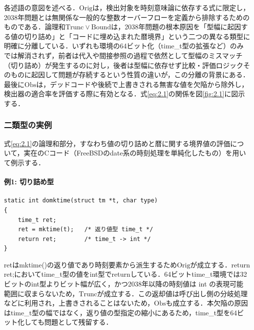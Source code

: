 \documentclass[submit,techrep,noauthor]{ipsj}
\begin{document}
各述語の意図を述べる．$\mathrm{Orig}$は，検出対象を時刻意味論に依存する式に限定し，2038年問題とは無関係な一般的な整数オーバーフローを定義から排除するためのものである．論理和$\mathrm{Trunc} \lor \mathrm{Bound}$は，2038年問題の根本原因を「型幅に起因する値の切り詰め」と「コードに埋め込まれた暦境界」という二つの異なる類型に明確に分離している．いずれも環境の64ビット化（time\_t型の拡張など）のみでは解消されず，前者は代入や間接参照の過程で依然として型幅のミスマッチ（切り詰め）が発生するのに対し，後者は型幅に依存せず比較・評価ロジックそのものに起因して問題が存続するという性質の違いが，この分離の背景にある．最後に$\mathrm{Obs}$は，デッドコードや後続で上書きされる無害な値を欠陥から除外し，検出器の適合率を評価する際に有効となる．式\ref{eq:2.1}の関係を図\ref{fig:2.1}に図示する．

\subsubsection{二類型の実例}

式\ref{eq:2.1}の論理和部分，すなわち値の切り詰めと暦に関する境界値の評価について，実在のCコード（FreeBSD\cite{ref3}のdate系の時刻処理を単純化したもの）を用いて例示する．

\paragraph*{例1: 切り詰め型}

\begin{tcolorbox}[
	enhanced,
	breakable,
	colframe=black,
	colback=black!4,
	coltext=black,
	left=2mm,
	right=2mm,
	top=2mm,
	bottom=2mm,
	enlarge top by=4pt,
	enlarge bottom by=4pt,
	before skip=4pt,
	after skip=4pt,
]
\begin{verbatim}
static int domktime(struct tm *t, char type)
{
    time_t ret;
    ret = mktime(t);   /* 返り値型 time_t */
    return ret;        /* time_t -> int */
}
\end{verbatim}
\end{tcolorbox}

retはmktime()の返り値であり時刻要素から派生するため$\mathrm{Orig}$が成立する．return ret;においてtime\_t型の値をint型でreturnしている．64ビットtime\_t環境では32ビットのint型よりビット幅が広く，かつ2038年以降の時刻値は int の表現可能範囲に収まらないため，$\mathrm{Trunc}$が成立する．この返却値は呼び出し側の分岐処理などに利用され，上書きされることはないため，$\mathrm{Obs}$も成立する．本欠陥の原因はtime\_t型の幅ではなく，返り値の型指定の縮小にあるため，time\_t型を64ビット化しても問題として残留する．
\end{document}
